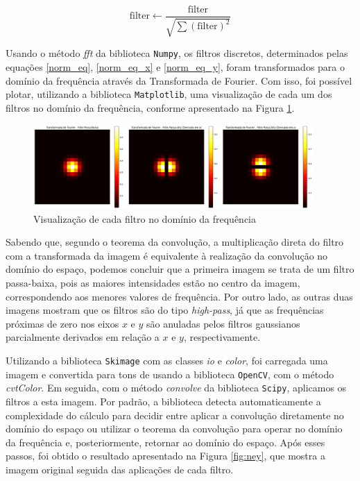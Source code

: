 \documentclass[a4paper, 11pt]{article}
\begin{document}
\[
\text{filter} \leftarrow \frac{\text{filter}}{\sqrt{\sum (\text{filter})^2}}
\]

Usando o método \textit{fft} da biblioteca \texttt{Numpy}, os filtros discretos, determinados pelas equações \ref{norm_eq}, \ref{norm_eq_x} e \ref{norm_eq_y}, foram transformados para o domínio da frequência através da Transformada de Fourier. Com isso, foi possível plotar, utilizando a biblioteca \texttt{Matplotlib}, uma visualização de cada um dos filtros no domínio da frequência, conforme apresentado na Figura \ref{fig:fil_freq}.

\begin{figure}[H]
    \centering 
    \includegraphics[width=0.95\textwidth]{imgs/filt_four.png}
    \caption{Visualização de cada filtro no domínio da frequência}
    \label{fig:fil_freq} 
\end{figure}

Sabendo que, segundo o teorema da convolução, a multiplicação direta do filtro com a transformada da imagem é equivalente à realização da convolução no domínio do espaço, podemos concluir que a primeira imagem se trata de um filtro passa-baixa, pois as maiores intensidades estão no centro da imagem, correspondendo aos menores valores de frequência. Por outro lado, as outras duas imagens mostram que os filtros são do tipo \textit{high-pass}, já que as frequências próximas de zero nos eixos $x$ e $y$ são anuladas pelos filtros gaussianos parcialmente derivados em relação a $x$ e $y$, respectivamente.

Utilizando a biblioteca \texttt{Skimage} com as classes \textit{io} e \textit{color}, foi carregada uma imagem e convertida para tons de usando a biblioteca \texttt{OpenCV}, com o método \textit{cvtColor}. Em seguida, com o método \textit{convolve} da biblioteca \texttt{Scipy}, aplicamos os filtros a esta imagem. Por padrão, a biblioteca detecta automaticamente a complexidade do cálculo para decidir entre aplicar a convolução diretamente no domínio do espaço ou utilizar o teorema da convolução para operar no domínio da frequência e, posteriormente, retornar ao domínio do espaço. Após esses passos, foi obtido o resultado apresentado na Figura \ref{fig:ney}, que mostra a imagem original seguida das aplicações de cada filtro.
\end{document}
